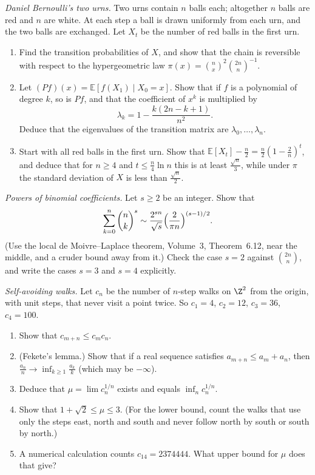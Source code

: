 \begin{exercise}[$\star\star\star$]\label{pb:bernoullilaplace}
\emph{Daniel Bernoulli's two urns.} Two urns contain $n$ balls each; altogether $n$ balls are red and $n$ are white. At each step a ball is
drawn uniformly from each urn, and the two balls are exchanged. Let $X_t$ be the number of red balls in the first urn.
\begin{enumerate}[label=(\alph*)]
\item Find the transition probabilities of $X$, and show that the chain is reversible with respect to the hypergeometric law
$\pi(x)=\binom nx^2\binom{2n}n^{-1}$.
\item Let $(Pf)(x)=\mathbb E[f(X_1)\mid X_0=x]$. Show that if $f$ is a polynomial of degree $k$, so is $Pf$, and that the coefficient of $x^k$ is multiplied by
\[
\lambda_k=1-\frac{k(2n-k+1)}{n^2}.
\]
Deduce that the eigenvalues of the transition matrix are $\lambda_0,\dots,\lambda_n$.
\item Start with all red balls in the first urn. Show that $\mathbb E[X_t]-\frac n2=\frac n2(1-\frac2n)^t$, and deduce that for $n\ge4$ and $t\le\frac n4\ln n$ this is at least
$\frac{\sqrt n}3$, while under $\pi$ the standard deviation of $X$ is less than $\frac{\sqrt n}2$.
\end{enumerate}
\end{exercise}

\begin{exercise}[$\star\star$]\label{pb:binompowers}
\emph{Powers of binomial coefficients.} Let $s\ge2$ be an integer. Show that
\[
\sum_{k=0}^n\binom nk^s\sim\frac{2^{sn}}{\sqrt s}\Bigl(\frac2{\pi n}\Bigr)^{(s-1)/2}.
\]
(Use the local de Moivre--Laplace theorem, Volume~3, Theorem~6.12, near the middle, and a cruder bound away from it.) Check the case $s=2$
against $\binom{2n}n$, and write the cases $s=3$ and $s=4$ explicitly.
\end{exercise}

\begin{exercise}[$\star\star$]\label{pb:saw}
\emph{Self-avoiding walks.} Let $c_n$ be the number of $n$-step walks on $\Z^2$ from the origin, with unit steps, that never visit a point twice. So $c_1=4$, $c_2=12$, $c_3=36$, $c_4=100$.
\begin{enumerate}[label=(\alph*)]
\item Show that $c_{m+n}\le c_mc_n$.
\item (Fekete's lemma.) Show that if a real sequence satisfies $a_{m+n}\le a_m+a_n$, then $\frac{a_n}n\to\inf_{k\ge1}\frac{a_k}k$ (which may be $-\infty$).
\item Deduce that $\mu=\lim c_n^{1/n}$ exists and equals $\inf_nc_n^{1/n}$.
\item Show that $1+\sqrt2\le\mu\le3$. (For the lower bound, count the walks that use only the steps east, north and south and never follow north by south or south by north.)
\item A numerical calculation counts $c_{14}=2374444$. What upper bound for $\mu$ does that give?
\end{enumerate}
\end{exercise}

